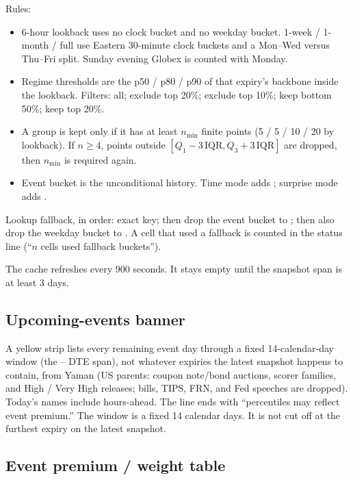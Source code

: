 \documentclass[11pt]{article}
\newcommand{\code}[1]{\texttt{\detokenize{#1}}}
\begin{document}
Rules:

\begin{itemize}
    \item 6-hour lookback uses no clock bucket and no weekday
    bucket.  1-week / 1-month / full use Eastern 30-minute clock
    buckets and a Mon--Wed versus Thu--Fri split.  Sunday evening
    Globex is counted with Monday.
    \item Regime thresholds are the p50 / p80 / p90 of that expiry's
    backbone inside the lookback.  Filters:
    all; exclude top 20\%; exclude top 10\%; keep bottom 50\%; keep
    top 20\%.
    \item A group is kept only if it has at least
    \(n_{\min}\) finite points (5 / 5 / 10 / 20 by lookback).
    If \(n\ge 4\), points outside \([Q_1-3\,\mathrm{IQR},
    Q_3+3\,\mathrm{IQR}]\) are dropped, then \(n_{\min}\) is
    required again.
    \item Event bucket \code{*} is the unconditional history.
    Time mode adds \code{t:...}; surprise mode adds \code{s:...}.
\end{itemize}

Lookup fallback, in order: exact key; then drop the event bucket to
\code{*}; then also drop the weekday bucket to \code{*}.
A cell that used a fallback is counted in the status line
(``\(n\) cells used fallback buckets'').

The cache refreshes every 900 seconds.  It stays empty until the
snapshot span is at least 3 days.

\subsection{Upcoming-events banner}

A yellow strip lists every remaining event day through a fixed
14-calendar-day window (the \code{2nd}--\code{10th} DTE span), not
whatever expiries the latest snapshot happens to contain, from
Yaman \code{events.sqlite} (US parents: coupon note/bond auctions,
scorer families, and High / Very High releases; bills, TIPS, FRN, and
Fed speeches are dropped).  Today's names include hours-ahead.
The line ends with ``percentiles may reflect event premium.''
The window is a fixed 14 calendar days.  It is not cut off at the
furthest expiry on the latest snapshot.

\subsection{Event premium / weight table}
\end{document}
